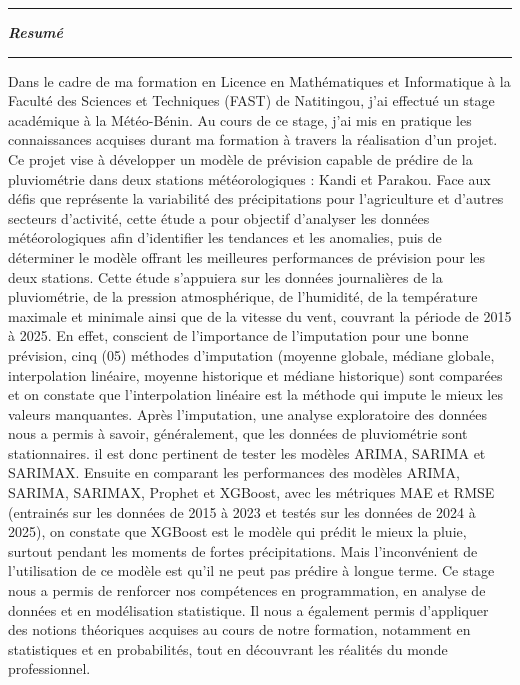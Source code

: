 \documentclass[a4paper,12pt]{report}
\theoremstyle{definition}
\begin{document}
	
	\phantom{}
	\newpage
	
	\begin{center}
		\colorbox{gray!0}{\rule{\textwidth}{0.005cm}}
		{\Huge\textbf{\textit{Resumé}}}
		\vspace{1cm}
		\colorbox{gray!0}{\rule{\textwidth}{0.005cm}}
	\end{center}
	Dans le cadre de ma formation en Licence en Mathématiques et Informatique à la Faculté des Sciences et Techniques (FAST) de Natitingou, j'ai effectué un stage académique à la Météo-Bénin. Au cours de ce stage, j'ai mis en pratique les connaissances acquises durant ma formation à travers la réalisation d'un projet. Ce projet vise à développer un modèle de prévision capable de prédire de la pluviométrie dans deux stations météorologiques : Kandi et Parakou. Face aux défis que représente la variabilité des précipitations pour l'agriculture et d'autres secteurs d'activité, cette étude a pour objectif d'analyser les données météorologiques afin d'identifier les tendances et les anomalies, puis de déterminer le modèle offrant les meilleures performances de prévision pour les deux stations. Cette étude s’appuiera sur les données journalières de la pluviométrie, de la pression atmosphérique, de l’humidité, de la température maximale et minimale ainsi que de la vitesse du vent, couvrant la période de 2015 à 2025. En effet, conscient de l'importance de l'imputation pour une bonne prévision, cinq (05) méthodes d'imputation (moyenne globale, médiane globale, interpolation linéaire, moyenne historique et médiane historique) sont comparées et on constate que l'interpolation linéaire est la méthode qui impute le mieux les valeurs manquantes. Après l'imputation, une analyse exploratoire des données nous a permis à savoir, généralement, que les données de pluviométrie sont stationnaires. il est donc pertinent de tester les modèles ARIMA, SARIMA et SARIMAX. 	Ensuite en comparant les performances des modèles ARIMA, SARIMA, SARIMAX, Prophet et XGBoost, avec les métriques MAE et RMSE (entrainés sur les données de 2015 à 2023 et testés sur les données de 2024 à 2025), on constate que XGBoost est le modèle qui prédit le mieux la pluie, surtout pendant les moments de fortes précipitations. Mais l'inconvénient de l'utilisation de ce modèle est qu'il ne peut pas prédire à longue terme. Ce stage nous a permis de renforcer nos compétences en programmation, en analyse de données et en modélisation statistique. Il nous a également permis d'appliquer des notions théoriques acquises au cours de notre formation, notamment en statistiques et en probabilités, tout en découvrant les réalités du monde professionnel.\\
	
\end{document}

